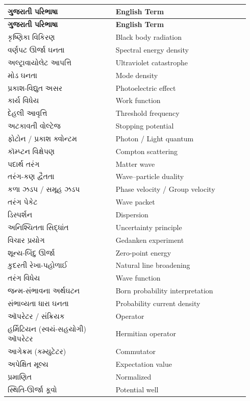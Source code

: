 \begin{longtable}{@{}p{0.42\linewidth}p{0.52\linewidth}@{}}
\toprule
\textbf{ગુજરાતી પરિભાષા} & \textbf{English Term} \\
\midrule
\endfirsthead
\toprule
\textbf{ગુજરાતી પરિભાષા} & \textbf{English Term} \\
\midrule
\endhead
કૃષ્ણિકા વિકિરણ & Black body radiation \\
વર્ણપટ ઊર્જા ઘનતા & Spectral energy density \\
અલ્ટ્રાવાયોલેટ આપત્તિ & Ultraviolet catastrophe \\
મોડ ઘનતા & Mode density \\
પ્રકાશ-વિદ્યુત અસર & Photoelectric effect \\
કાર્ય વિધેય & Work function \\
દેહલી આવૃત્તિ & Threshold frequency \\
અટકાવતી વોલ્ટેજ & Stopping potential \\
ફોટોન / પ્રકાશ ક્વોન્ટમ & Photon / Light quantum \\
કૉમ્પ્ટન વિક્ષેપણ & Compton scattering \\
પદાર્થ તરંગ & Matter wave \\
તરંગ-કણ દ્વૈતતા & Wave--particle duality \\
કળા ઝડપ / સમૂહ ઝડપ & Phase velocity / Group velocity \\
તરંગ પેકેટ & Wave packet \\
ડિસ્પર્શન & Dispersion \\
અનિશ્ચિતતા સિદ્ધાંત & Uncertainty principle \\
વિચાર પ્રયોગ & Gedanken experiment \\
શૂન્ય-બિંદુ ઊર્જા & Zero-point energy \\
કુદરતી રેખા-પહોળાઈ & Natural line broadening \\
તરંગ વિધેય & Wave function \\
જન્મ-સંભાવના અર્થઘટન & Born probability interpretation \\
સંભાવ્યતા ધારા ઘનતા & Probability current density \\
ઑપરેટર / સંક્રિયક & Operator \\
હર્મિટિયન (સ્વયં-સહયોગી) ઑપરેટર & Hermitian operator \\
આગેક્રમ (કમ્યુટેટર) & Commutator \\
અપેક્ષિત મૂલ્ય & Expectation value \\
પ્રમાણિત & Normalized \\
સ્થિતિ-ઊર્જા કૂવો & Potential well \\

\end{longtable}
